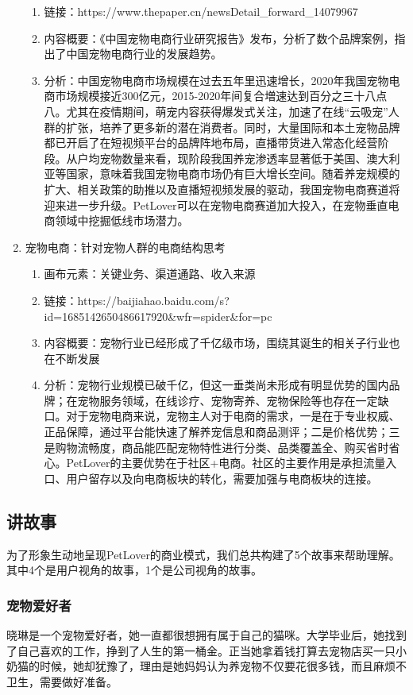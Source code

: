 \documentclass[a4paper]{ctexart}
\begin{document}
\begin{enumerate}[label=\alph*.]
\begin{enumerate}[label=\alph*.]
    \item 链接：https://www.thepaper.cn/newsDetail\_forward\_14079967
    \item 内容概要：《中国宠物电商行业研究报告》发布，分析了数个品牌案例，指出了中国宠物电商行业的发展趋势。
    \item 分析：中国宠物电商市场规模在过去五年里迅速增长，2020年我国宠物电商市场规模接近300亿元，2015-2020年间复合増速达到百分之三十八点八。尤其在疫情期间，萌宠内容获得爆发式关注，加速了在线“云吸宠”人群的扩张，培养了更多新的潜在消费者。同时，大量国际和本土宠物品牌都已开启了在短视频平台的品牌阵地布局，直播带货进入常态化经营阶段。从户均宠物数量来看，现阶段我国养宠渗透率显著低于美国、澳大利亚等国家，意味着我国宠物电商市场仍有巨大增长空间。随着养宠规模的扩大、相关政策的助推以及直播短视频发展的驱动，我国宠物电商赛道将迎来进一步升级。PetLover可以在宠物电商赛道加大投入，在宠物垂直电商领域中挖掘低线市场潜力。
  \end{enumerate}
  \item 宠物电商：针对宠物人群的电商结构思考
  \begin{enumerate}[label=\alph*.]
    \item 画布元素：关键业务、渠道通路、收入来源
    \item 链接：https://baijiahao.baidu.com/s?id=1685142650486617920\&wfr=spider\&for=pc
    \item 内容概要：宠物行业已经形成了千亿级市场，围绕其诞生的相关子行业也在不断发展
    \item 分析：宠物行业规模已破千亿，但这一垂类尚未形成有明显优势的国内品牌；在宠物服务领域，在线诊疗、宠物寄养、宠物保险等也存在一定缺口。对于宠物电商来说，宠物主人对于电商的需求，一是在于专业权威、正品保障，通过平台能快速了解养宠信息和商品测评；二是价格优势；三是购物流畅度，商品能匹配宠物特性进行分类、品类覆盖全、购买省时省心。PetLover的主要优势在于社区+电商。社区的主要作用是承担流量入口、用户留存以及向电商板块的转化，需要加强与电商板块的连接。
  \end{enumerate}
\end{enumerate}

\subsection{讲故事}

为了形象生动地呈现PetLover的商业模式，我们总共构建了5个故事来帮助理解。其中4个是用户视角的故事，1个是公司视角的故事。

\subsubsection{宠物爱好者}
晓琳是一个宠物爱好者，她一直都很想拥有属于自己的猫咪。大学毕业后，她找到了自己喜欢的工作，挣到了人生的第一桶金。正当她拿着钱打算去宠物店买一只小奶猫的时候，她却犹豫了，理由是她妈妈认为养宠物不仅要花很多钱，而且麻烦不卫生，需要做好准备。
\end{document}
